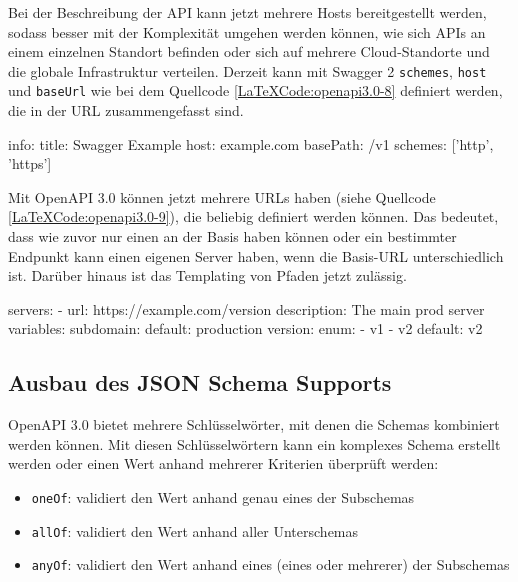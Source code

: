 Bei der Beschreibung der API kann jetzt mehrere Hosts bereitgestellt werden, sodass besser mit der Komplexität umgehen werden können, wie sich APIs an einem einzelnen Standort befinden oder sich auf mehrere Cloud-Standorte und die globale Infrastruktur verteilen. Derzeit kann mit Swagger 2 \texttt{schemes}, \texttt{host} und \texttt{baseUrl} wie bei dem Quellcode \ref{LaTeXCode:openapi3.0-8} definiert werden, die in der URL zusammengefasst sind. 

\begin{LaTeXCode}[caption={Swagger 2.0 - Server},captionpos=b, label=LaTeXCode:openapi3.0-8][numbers=none]
info:  
	title: Swagger Example
host: example.com  
basePath: /v1  
schemes: ['http', 'https']
\end{LaTeXCode}

Mit OpenAPI 3.0 können jetzt mehrere URLs haben (siehe Quellcode \ref{LaTeXCode:openapi3.0-9}), die beliebig definiert werden können. Das bedeutet, dass wie zuvor nur einen an der Basis haben können oder ein bestimmter Endpunkt kann einen eigenen Server haben, wenn die Basis-URL unterschiedlich ist. Darüber hinaus ist das Templating von Pfaden jetzt zulässig.

\begin{LaTeXCode}[caption={OpenAPI 3.0 - Server},captionpos=b, label=LaTeXCode:openapi3.0-9][numbers=none]
servers:  
- url: https://example.com/{version}
	description: The main prod server
	variables:
	  subdomain:
	   default: production
	  version:
	   enum:
		- v1
		- v2
	   default: v2
\end{LaTeXCode} 

\subsection{Ausbau des JSON Schema Supports}

OpenAPI 3.0 bietet mehrere Schlüsselwörter, mit denen die Schemas kombiniert werden können. Mit diesen Schlüsselwörtern kann ein komplexes Schema erstellt werden oder einen Wert anhand mehrerer Kriterien überprüft werden\cite{openapijsonaufbau17}:

\begin{itemize}
	\item \texttt{oneOf}: validiert den Wert anhand genau eines der Subschemas
	\item \texttt{allOf}: validiert den Wert anhand aller Unterschemas
	\item \texttt{anyOf}: validiert den Wert anhand eines (eines oder mehrerer) der Subschemas
\end{itemize}


